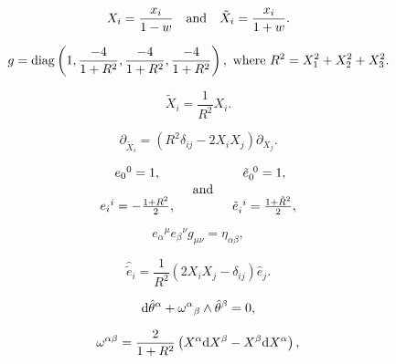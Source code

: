\documentclass[]{article}
\begin{document}
	\begin{equation}
		X_i = \frac{x_i}{1-w} 
		{\rm ~~~and~~~}
		{\tilde X}_i = \frac{x_i}{1+w}.
	\end{equation}
	
	\begin{equation}
		g = {\rm diag} \left(1, \frac{-4}{1+R^2},\frac{-4}{1+R^2},\frac{-4}{1+R^2}
		\right),\ 
		{\rm where}\
		R^2 = X_1^2+X_2^2+X_3^2.
	\end{equation}
	
	\begin{equation}
		{\tilde X}_i = \frac{1}{R^2} X_i.
	\end{equation}
	
	\begin{equation} 
		\partial_{{\tilde X}_i} = \left(R^2 \delta_{ij} - 2 X_i X_j \right)
		\partial_{X_j}.
	\end{equation}
	
	\begin{eqnarray}
		\begin{array}{c}
			{e_0}^0 = 1, \\ \\
			{e_i}^i = - \frac{1+R^2}{2},
		\end{array}
		{\rm ~~~and~~~}
		\begin{array}{c}
			{{\tilde e}_0}^{~0} = 1, \\ \\
			{{\tilde e}_i}^{~i} =  \frac{1+{\tilde R}^2}{2},
		\end{array}
	\end{eqnarray}
	
	\begin{equation}
		{e_\alpha}^\mu {e_\beta}^\nu g_{\mu \nu} = \eta_{\alpha \beta},
	\end{equation}
	
	\begin{equation}
		\label{erotation}
		{\hat {\tilde e}}_i = \frac{1}{R^2} \left( 2 X_i X_j - \delta_{i j}\right) {\hat
			e}_j.
	\end{equation}
	
	\begin{equation}
		{\rm d} {\hat \theta}^\alpha + {\omega^\alpha}_\beta \wedge {\hat
			\theta}^\beta = 0,
	\end{equation}
	
	\begin{equation}
		\omega^{\alpha \beta} = \frac{2}{1+R^2} \left( X^\alpha {\rm d}
		X^\beta - X^\beta {\rm d} X^\alpha \right),
	\end{equation}
	
\end{document}
